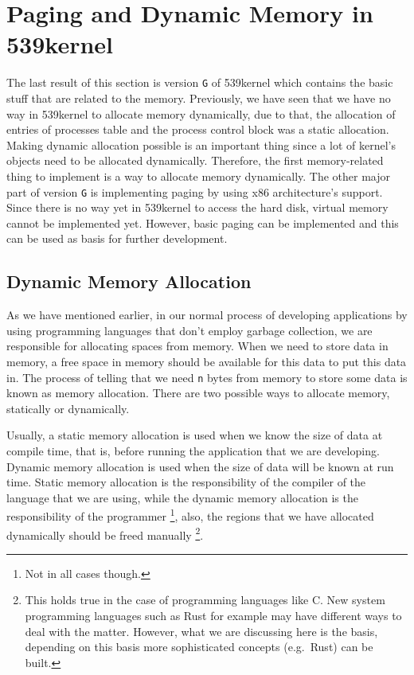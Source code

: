 \section{Paging and Dynamic Memory in
539kernel}\label{paging-and-dynamic-memory-in-539kernel}

The last result of this section is version \lstinline!G! of 539kernel
which contains the basic stuff that are related to the memory.
Previously, we have seen that we have no way in 539kernel to allocate
memory dynamically, due to that, the allocation of entries of processes
table and the process control block was a static allocation. Making
dynamic allocation possible is an important thing since a lot of
kernel's objects need to be allocated dynamically. Therefore, the first
memory-related thing to implement is a way to allocate memory
dynamically. The other major part of version \lstinline!G! is
implementing paging by using x86 architecture's support. Since there is
no way yet in 539kernel to access the hard disk, virtual memory cannot
be implemented yet. However, basic paging can be implemented and this
can be used as basis for further development.

\subsection{Dynamic Memory Allocation}\label{dynamic-memory-allocation}

As we have mentioned earlier, in our normal process of developing
applications by using programming languages that don't employ garbage
collection, we are responsible for allocating spaces from memory. When
we need to store data in memory, a free space in memory should be
available for this data to put this data in. The process of telling that
we need \lstinline!n! bytes from memory to store some data is known as
memory allocation. There are two possible ways to allocate memory,
statically or dynamically.

Usually, a static memory allocation is used when we know the size of
data at compile time, that is, before running the application that we
are developing. Dynamic memory allocation is used when the size of data
will be known at run time. Static memory allocation is the
responsibility of the compiler of the language that we are using, while
the dynamic memory allocation is the responsibility of the programmer
\footnote{Not in all cases though.}, also, the regions that we have
allocated dynamically should be freed manually \footnote{This holds true
  in the case of programming languages like C. New system programming
  languages such as Rust for example may have different ways to deal
  with the matter. However, what we are discussing here is the basis,
  depending on this basis more sophisticated concepts (e.g.~Rust) can be
  built.}.

